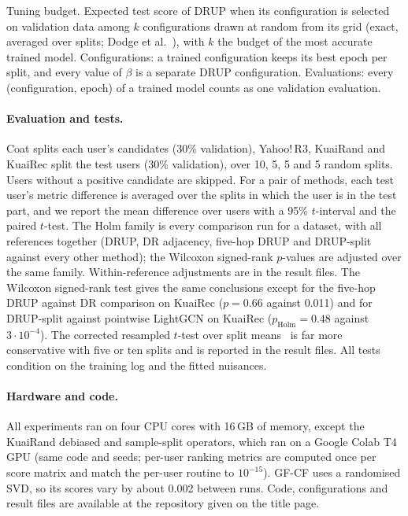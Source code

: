 \begin{table}[h]\centering\footnotesize
\caption{Tuning budget. Expected test score of DRUP when its configuration is
selected on validation data among $k$ configurations drawn at random from its
grid (exact, averaged over splits; Dodge et al.~\cite{dodge2019showyourwork}), with
$k$ the budget of the most accurate trained model. Configurations: a trained
configuration keeps its best epoch per split, and every value of $\beta$ is a
separate DRUP configuration. Evaluations: every (configuration, epoch) of a
trained model counts as one validation evaluation.}\label{tab:budget}
\begin{adjustbox}{max width=\textwidth}

\end{adjustbox}
\end{table}

\paragraph{Evaluation and tests.}
Coat splits each user's candidates (30\% validation), Yahoo!\,R3, KuaiRand and
KuaiRec split the test users (30\% validation), over 10, 5, 5 and 5 random splits.
Users without a positive candidate are skipped. For a pair of methods, each
test user's metric difference is averaged over the splits in which the user
is in the test part, and we report the mean difference over users with a
95\% $t$-interval and the paired $t$-test. The Holm family is every comparison
run for a dataset, with all references together (DRUP, DR adjacency, five-hop
DRUP and DRUP-split against every other method); the Wilcoxon signed-rank
$p$-values are adjusted over the same family. Within-reference adjustments are
in the result files. The Wilcoxon signed-rank test gives the same conclusions except for the
five-hop DRUP against DR comparison on KuaiRec ($p=0.66$ against 0.011) and for
DRUP-split against pointwise LightGCN on KuaiRec ($p_{\mathrm{Holm}}=0.48$ against $3\cdot10^{-4}$). The
corrected resampled $t$-test over split means~\cite{nadeau2003} is far more
conservative with five or ten splits and is reported in the result files.
All tests condition on the training log and the fitted nuisances.

\paragraph{Hardware and code.}
All experiments ran on four CPU cores with 16\,GB of memory, except the KuaiRand
debiased and sample-split operators, which ran on a Google Colab T4 GPU (same code and
seeds; per-user ranking metrics are computed once per score matrix and match the
per-user routine to $10^{-15}$). GF-CF uses a randomised SVD, so its scores vary by
about 0.002 between runs.
Code, configurations and result files are available at the repository given
on the title page.
